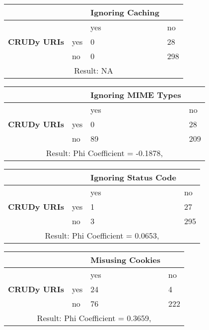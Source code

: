\documentclass[a4paper,12pt]{article}
\begin{document}
\begin{center}
  \begin{tabular}{| p{60mm} | p{10mm} | p{35mm} | p{35mm} |}
  \hline
   & & \textbf{Ignoring Caching} &
  \\
  \hline
  & & yes & no
  \\
  \hline
  \textbf{CRUDy URIs} & yes & 0 & 28
  \\
  \hline
   & no & 0 & 298
  \\
  \hline
  \multicolumn{4}{|c|}{Result: NA}
  \\ \hline
  \end{tabular}
  \end{center}

\begin{center}
  \begin{tabular}{| p{60mm} | p{10mm} | p{35mm} | p{35mm} |}
  \hline
   & & \textbf{Ignoring MIME Types} &
  \\
  \hline
  & & yes & no
  \\
  \hline
  \textbf{CRUDy URIs} & yes & 0 & 28
  \\
  \hline
   & no & 89 & 209
  \\
  \hline
  \multicolumn{4}{|c|}{Result: Phi Coefficient = -0.1878, }
  \\ \hline
  \end{tabular}
  \end{center}

\begin{center}
  \begin{tabular}{| p{60mm} | p{10mm} | p{35mm} | p{35mm} |}
  \hline
   & & \textbf{Ignoring Status Code} &
  \\
  \hline
  & & yes & no
  \\
  \hline
  \textbf{CRUDy URIs} & yes & 1 & 27
  \\
  \hline
   & no & 3 & 295
  \\
  \hline
  \multicolumn{4}{|c|}{Result: Phi Coefficient = 0.0653, }
  \\ \hline
  \end{tabular}
  \end{center}

\begin{center}
  \begin{tabular}{| p{60mm} | p{10mm} | p{35mm} | p{35mm} |}
  \hline
   & & \textbf{Misusing Cookies} &
  \\
  \hline
  & & yes & no
  \\
  \hline
  \textbf{CRUDy URIs} & yes & 24 & 4
  \\
  \hline
   & no & 76 & 222
  \\
  \hline
  \multicolumn{4}{|c|}{Result: Phi Coefficient = 0.3659, }
  \\ \hline
  \end{tabular}
  \end{center}
\end{document}
